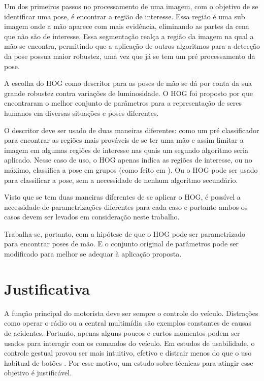 Um dos primeiros passos no processamento de uma imagem, com o objetivo de se identificar uma pose, é encontrar a região de interesse. Essa região é uma sub imagem onde a mão aparece com mais evidência, eliminando as partes da cena que não são de interesse. Essa segmentação realça a região da imagem na qual a mão se encontra, permitindo que a aplicação de outros algoritmos para a detecção da pose possua maior robustez, uma vez que já se tem um pré processamento da pose.

A escolha do HOG como descritor para as poses de mão se dá por conta da sua grande robustez contra variações de luminosidade. O HOG foi proposto por  que encontraram o melhor conjunto de parâmetros para a representação de seres humanos em diversas situações e poses diferentes. 

O descritor deve ser usado de duas maneiras diferentes: como um pré classificador para encontrar as regiões mais prováveis de se ter uma mão e assim limitar a imagem em algumas regiões de interesse nas quais um segundo algoritmo seria aplicado. Nesse caso de uso, o HOG apenas indica as regiões de interesse, ou no máximo, classifica a pose em grupos (como feito em \cite{jiang2012robust}). Ou o HOG pode ser usado para classificar a pose, sem a necessidade de nenhum algoritmo secundário.

Visto que se tem duas maneiras diferentes de se aplicar o HOG, é possível a necessidade de parametrizações diferentes para cada caso e portanto ambos os casos devem ser levados em consideração neste trabalho.

Trabalha-se, portanto, com a hipótese de que o HOG pode ser parametrizado para encontrar poses de mão. E o conjunto original de parâmetros pode ser modificado para melhor se adequar à aplicação proposta.

\section{Justificativa}

A função principal do motorista deve ser sempre o controle do veículo. Distrações como operar o rádio ou a central multimídia são exemplos constantes de causas de acidentes. Portanto, apenas alguns poucos e curtos momentos podem ser usados para interagir com os comandos do veículo. Em estudos de usabilidade, o controle gestual provou ser mais intuitivo, efetivo \cite{zobl2001usability} e distrair menos do que o uso habitual de botões \cite{geiger2001intermodal}. Por esse motivo, um estudo sobre técnicas para atingir esse objetivo é justificável.

